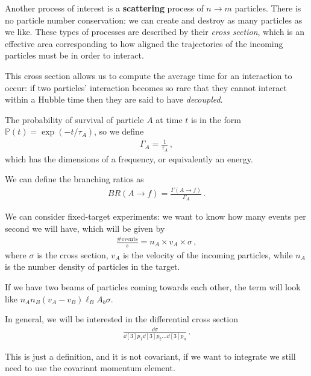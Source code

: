\documentclass[main.tex]{subfiles}
\begin{document}
Another process of interest is a \textbf{scattering} process of \(n \to m \) particles. 
There is no particle number conservation: we can create and destroy as many particles as we like. 
These types of processes are described by their \emph{cross section}, which is an effective area corresponding to how aligned the trajectories of the incoming particles must be in order to interact.

This cross section allows us to compute the average time for an interaction to occur: if two particles' interaction becomes so rare that they cannot interact within a Hubble time then they are said to have \emph{decoupled}. 

The probability of survival of particle \(A\) at time \(t\) is in the form \(\mathbb{P}(t) = \exp(-t / \tau_{A})\), so we define 
%
\begin{align}
\Gamma_{A} = \frac{1}{\tau_{A}}
\,,
\end{align}
%
which has the dimensions of a frequency, or equivalently an energy. 

We can define the branching ratios as 
%
\begin{align}
BR(A \to f) = \frac{ \Gamma (A \to f)}{\Gamma_{A}}
\,.
\end{align}

We can consider fixed-target experiments: we want to know how many events per second we will have, which will be given by 
%
\begin{align}
\frac{\text{\# events}}{s} = n_A \times v_A \times \sigma 
\,,
\end{align}
%
where \(\sigma \) is the cross section, \(v_A\) is the velocity of the incoming particles, while \(n_A\) is the number density of particles in the target. 

If we have two beams of particles coming towards each other, the term will look like \(n_A n_B (v_A - v_B) \ell_B A_b \sigma \). 

In general, we will be interested in the differential cross section 
%
\begin{align}
\frac{ \dd{\sigma }}{ \dd[3]{p_1 } \dd[3]{p_2 } \dots \dd[3]{p_{n}}}
\,.
\end{align}

This is just a definition, and it is not covariant, if we want to integrate we still need to use the covariant momentum element. 
\end{document}
